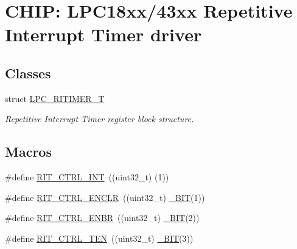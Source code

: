 \hypertarget{group___r_i_t_i_m_e_r__18_x_x__43_x_x}{}\section{C\+H\+IP\+: L\+P\+C18xx/43xx Repetitive Interrupt Timer driver}
\label{group___r_i_t_i_m_e_r__18_x_x__43_x_x}
\subsection*{Classes}
\begin{DoxyCompactItemize}
\item 
struct \hyperlink{struct_l_p_c___r_i_t_i_m_e_r___t}{L\+P\+C\+\_\+\+R\+I\+T\+I\+M\+E\+R\+\_\+T}
\begin{DoxyCompactList}\small\item\em Repetitive Interrupt Timer register block structure. \end{DoxyCompactList}\end{DoxyCompactItemize}
\subsection*{Macros}
\begin{DoxyCompactItemize}
\item 
\#define \hyperlink{group___r_i_t_i_m_e_r__18_x_x__43_x_x_ga35abb740dd6c6be63ef5ee80db909f48}{R\+I\+T\+\_\+\+C\+T\+R\+L\+\_\+\+I\+NT}~((uint32\+\_\+t) (1))
\item 
\#define \hyperlink{group___r_i_t_i_m_e_r__18_x_x__43_x_x_ga16cdab6f304738d645d704ae2d161412}{R\+I\+T\+\_\+\+C\+T\+R\+L\+\_\+\+E\+N\+C\+LR}~((uint32\+\_\+t) \hyperlink{group___l_p_c___types___public___macros_ga7ee022f5e5a971a8324e4b7572d49170}{\+\_\+\+B\+IT}(1))
\item 
\#define \hyperlink{group___r_i_t_i_m_e_r__18_x_x__43_x_x_ga5b766561bf28441b64bc533325e43be0}{R\+I\+T\+\_\+\+C\+T\+R\+L\+\_\+\+E\+N\+BR}~((uint32\+\_\+t) \hyperlink{group___l_p_c___types___public___macros_ga7ee022f5e5a971a8324e4b7572d49170}{\+\_\+\+B\+IT}(2))
\item 
\#define \hyperlink{group___r_i_t_i_m_e_r__18_x_x__43_x_x_gae2134d5c74919d6016d09b7d410b7b3d}{R\+I\+T\+\_\+\+C\+T\+R\+L\+\_\+\+T\+EN}~((uint32\+\_\+t) \hyperlink{group___l_p_c___types___public___macros_ga7ee022f5e5a971a8324e4b7572d49170}{\+\_\+\+B\+IT}(3))
\end{DoxyCompactItemize}
